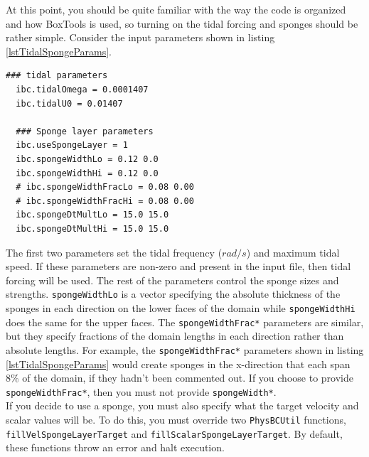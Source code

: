 \documentclass[12pt]{article}
\begin{document}
At this point, you should be quite familiar with the way the code is organized and how BoxTools is used, so turning on the tidal forcing and sponges should be rather simple. Consider the input parameters shown in listing \ref{lstTidalSpongeParams}.
\begin{lstlisting}[label=lstTidalSpongeParams,caption={Sample tidal and sponge forcing input parameters.}]
  ### tidal parameters
  ibc.tidalOmega = 0.0001407
  ibc.tidalU0 = 0.01407

  ### Sponge layer parameters
  ibc.useSpongeLayer = 1
  ibc.spongeWidthLo = 0.12 0.0
  ibc.spongeWidthHi = 0.12 0.0
  # ibc.spongeWidthFracLo = 0.08 0.00
  # ibc.spongeWidthFracHi = 0.08 0.00
  ibc.spongeDtMultLo = 15.0 15.0
  ibc.spongeDtMultHi = 15.0 15.0  
\end{lstlisting}
The first two parameters set the tidal frequency ($rad/s$) and maximum tidal speed. If these parameters are non-zero and present in the input file, then tidal forcing will be used. The rest of the parameters control the sponge sizes and strengths. \texttt{spongeWidthLo} is a vector specifying the absolute thickness of the sponges in each direction on the lower faces of the domain while \texttt{spongeWidthHi} does the same for the upper faces. The \texttt{spongeWidthFrac*} parameters are similar, but they specify fractions of the domain lengths in each direction rather than absolute lengths. For example, the \texttt{spongeWidthFrac*} parameters shown in listing \ref{lstTidalSpongeParams} would create sponges in the x-direction that each span $8\%$ of the domain, if they hadn't been commented out. If you choose to provide \texttt{spongeWidthFrac*}, then you must not provide \texttt{spongeWidth*}.\\

If you decide to use a sponge, you must also specify what the target velocity and scalar values will be. To do this, you must override two \texttt{PhysBCUtil} functions, \texttt{fillVelSpongeLayerTarget} and \texttt{fillScalarSpongeLayerTarget}. By default, these functions throw an error and halt execution.

% 
%
% 
% 


\end{document}
